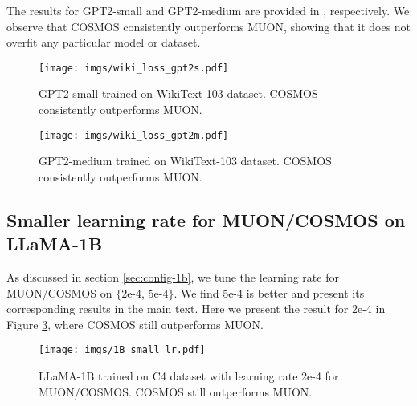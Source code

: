 The results for GPT2-small and GPT2-medium are provided in , respectively. 
We observe that COSMOS consistently outperforms MUON, showing that it does not overfit any particular model or dataset. 

\begin{figure}[htb!]
    \centering
    \texttt{[image: imgs/wiki\_loss\_gpt2s.pdf]}
    \caption{GPT2-small trained on WikiText-103 dataset. COSMOS consistently outperforms MUON. }
    \label{fig:exp-gpt2s}
\end{figure}
\begin{figure}[htb!]
    \centering
    \texttt{[image: imgs/wiki\_loss\_gpt2m.pdf]}
    \caption{GPT2-medium trained on WikiText-103 dataset. COSMOS consistently outperforms MUON. }
    \label{fig:exp-gpt2m}
\end{figure}

\subsection{Smaller learning rate for MUON/COSMOS on LLaMA-1B}
As discussed in section \ref{sec:config-1b}, we tune the learning rate for MUON/COSMOS on $\{$2e-4, 5e-4$\}$. We find 5e-4 is better and present its corresponding results in the main text. Here we present the result for 2e-4 in Figure \ref{fig:exp-1b-small}, where COSMOS still outperforms MUON.

\begin{figure}[htb!]
    \centering
    \texttt{[image: imgs/1B\_small\_lr.pdf]}
    \caption{LLaMA-1B trained on C4 dataset with learning rate 2e-4 for MUON/COSMOS. COSMOS still outperforms MUON.}
    \label{fig:exp-1b-small}
\end{figure}
